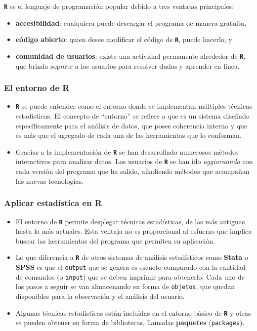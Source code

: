 \documentclass[
]{article}
\begin{document}
\textbf{\texttt{R}} es el lenguaje de programación popular debido a tres ventajas principales:

\begin{itemize}
\item
  \textbf{accesibilidad}: cualquiera puede descargar el programa de manera gratuita,
\item
  \textbf{código abierto}: quien desee modificar el código de \textbf{\texttt{R}}, puede hacerlo, y
\item
  \textbf{comunidad de usuarios}: existe una actividad permanente alrededor de \textbf{\texttt{R}}, que brinda soporte a los usuarios para resolver dudas y aprender en línea.
\end{itemize}

\hypertarget{el-entorno-de-r}{%
\subsubsection{El entorno de R}\label{el-entorno-de-r}}

\begin{itemize}
\item
  \textbf{\texttt{R}} se puede entender como el entorno donde se implementan múltiples técnicas estadísticas. El concepto de ``entorno'' se refiere a que es un sistema diseñado específicamente para el análisis de datos, que posee coherencia interna y que es más que el agregado de cada una de las herramientas que lo conforman.
\item
  Gracias a la implementación de \textbf{\texttt{R}} se han desarrollado numerosos métodos interactivos para analizar datos. Los usuarios de \textbf{\texttt{R}} se han ido \emph{aggiornando} con cada versión del programa que ha salido, añadiendo métodos que acompañan las nuevas tecnologías.
\end{itemize}

\hypertarget{aplicar-estaduxedstica-en-r}{%
\subsubsection{Aplicar estadística en R}\label{aplicar-estaduxedstica-en-r}}

\begin{itemize}
\item
  El entorno de \textbf{\texttt{R}} permite desplegar técnicas estadísticas, de las más antiguas hasta la más actuales. Esta ventaja no es proporcional al esfuerzo que implica buscar las herramientas del programa que permiten su aplicación.
\item
  Lo que diferencia a \textbf{\texttt{R}} de otros sistemas de análisis estadísticos como \textbf{Stata} o \textbf{SPSS} es que el \texttt{output} que se genera es escueto comparado con la cantidad de comandos (o \texttt{input}) que se deben imprimir para obtenerlo. Cada uno de los pasos a seguir se van almacenando en forma de \texttt{objetos}, que quedan disponibles para la observación y el análisis del usuario.
\item
  Algunas técnicas estadísticas están incluidas en el entorno básico de \textbf{\texttt{R}} y otras se pueden obtener en forma de bibliotecas, llamadas \textbf{paquetes} (\texttt{packages}).
\end{itemize}
\end{document}
